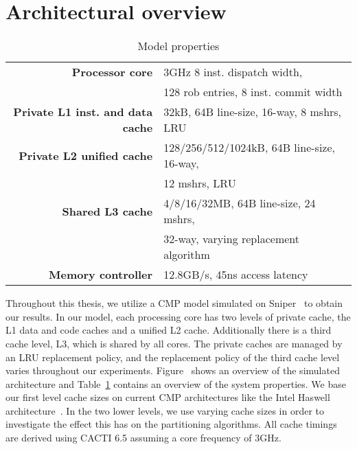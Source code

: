 
\section{Architectural overview}


\begin{table}[ht]
\centering
\begin{tabular}{rl}
\toprule
\bf{Processor core}                 & 3GHz 8 inst. dispatch width,          \\
                                    & 128 rob entries, 8 inst. commit width \\
\bf{Private L1 inst. and data cache}& 32kB, 64B line-size, 16-way, 8 mshrs, LRU \\
\bf{Private L2 unified cache}       & 128/256/512/1024kB, 64B line-size, 16-way, \\
                                    & 12 mshrs, LRU      \\
\bf{Shared L3 cache}                & 4/8/16/32MB, 64B line-size, 24 mshrs, \\
                                    & 32-way, varying replacement algorithm         \\
\bf{Memory controller}              & 12.8GB/s, 45ns access latency         \\
\bottomrule                             
\end{tabular}
\caption{Model properties}
\label{tbl:processor_model:properties}
\end{table}

Throughout this thesis, we utilize a CMP model simulated on Sniper~\cite{Carlson2011a} to obtain our results. 
In our model, each processing core has two levels of private cache, the L1 data and code caches and a unified L2 cache.
Additionally there is a third cache level, L3, which is shared by all cores. 
The private caches are managed by an LRU replacement policy, and the replacement policy of the third cache level varies throughout our experiments.
Figure~ shows an overview of the simulated architecture and Table~\ref{tbl:processor_model:properties} contains an overview of the system properties.
We base our first level cache sizes on current CMP architectures like the Intel Haswell architecture~\cite{Jain2013}. 
In the two lower levels, we use varying cache sizes in order to investigate the effect this has on the partitioning algorithms.
All cache timings are derived using CACTI 6.5 assuming a core frequency of 3GHz.

